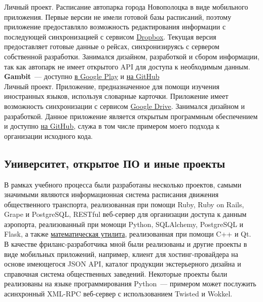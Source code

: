         Личный проект. Расписание автопарка города Новополоцка в виде мобильного приложения.
        Первые версии не имели готовой базы расписаний, поэтому приложение
        предоставляло возможность редактирования информации с последующей синхронизацией
        с сервисом \href{https://dropbox.com}{Dropbox}. Текущая версия
        предоставляет готовые данные о рейсах, синхронизируясь
        с сервером собственной разработки. Занимался дизайном, разработкой
        и сбором информации, так как автопарк не имеет открытого API для доступа
        к необходимым данным. \\

      \textbf{Gambit}~--- доступно \href{https://play.google.com/store/apps/details?id=ru.ming13.gambit}{в Google Play}
        и \href{https://github.com/ming13/gambit}{на GitHub} \\

        Личный проект. Приложение, предназначенное для помощи изучения иностранных языков,
        используя словарные карточки. Приложение имеет возможность
        синхронизации с сервисом \href{https://drive.google.com}{Google Drive}.
        Занимался дизайном
        и разработкой. Данное приложение является открытым программным обеспечением
        и доступно \href{https://github.com/ming13/gambit}{на GitHub},
        служа в том числе примером моего подхода к организации исходного кода.

    \subsection*{Университет, открытое ПО и иные проекты}

      В рамках учебного процесса были разработаны несколько проектов,
      самыми значимыми являются
      информационная система расписания движения общественного транспорта,
      реализованная при помощи Ruby, Ruby on Rails, Grape и PostgreSQL,
      RESTful веб-сервер для организации доступа к данным аэропорта, реализованный
      при момощи Python, SQLAlchemy, PostgreSQL и Flask, а также
      \href{https://github.com/ming13/aequatio}{математическая утилита},
      реализованная при помощи C++ и Qt. \\

      В качестве фриланс-разработчика
      мной были реализованы и другие проекты в виде мобильных приложений,
      например, клиент для хостинг-провайдера на основе имеющегося
      JSON API, каталог продукции экстерьерного дизайна и справочная система
      общественных заведений.
      Некоторые проекты были реализованы на языке программирования Python~--- примером может послужить
      асинхронный XML-RPC веб-сервер с использованием Twisted и Wokkel. \\

